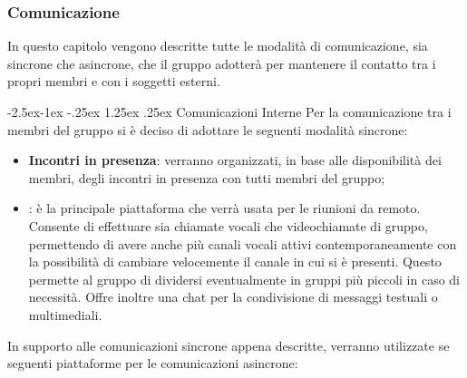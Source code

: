 \documentclass[a4paper,12pt]{article}
\makeatletter
\renewcommand\paragraph{\@startsection{paragraph}{4}{\z@}%
            {-2.5ex\@plus -1ex \@minus -.25ex}%
            {1.25ex \@plus .25ex}%
            {\normalfont\normalsize\bfseries}}
\makeatother
\begin{document}
        \subsubsection{Comunicazione}
            In questo capitolo vengono descritte tutte le modalità di comunicazione, sia sincrone che asincrone, che il gruppo adotterà per mantenere il contatto tra i propri membri e con i soggetti esterni.
            
            \paragraph{Comunicazioni Interne}
                Per la comunicazione tra i membri del gruppo si è deciso di adottare le seguenti modalità sincrone:
                \begin{itemize}
                    \item \textbf{Incontri in presenza}: verranno organizzati, in base alle disponibilità dei membri, degli incontri in presenza con tutti membri del gruppo;
                    \item \textbf{\underline{}}: è la principale piattaforma che verrà usata per le riunioni da remoto.
                        Consente di effettuare sia chiamate vocali che videochiamate di gruppo, permettendo di avere anche più canali vocali attivi contemporaneamente con la possibilità di cambiare velocemente il canale in cui si è presenti.
                        Questo permette al gruppo di dividersi eventualmente in gruppi più piccoli in caso di necessità.
                        Offre inoltre una chat per la condivisione di messaggi testuali o multimediali.
                \end{itemize}
                In supporto alle comunicazioni sincrone appena descritte, verranno utilizzate se seguenti piattaforme per le comunicazioni asincrone:
\end{document}
